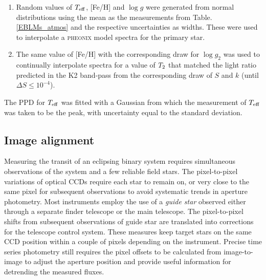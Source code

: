\begin{enumerate}
    \item Random values of $T_{\rm eff}$, [Fe/H] and $\log g$ were generated from normal distributions using the mean as the measurements from Table.\ref{EBLMs_atmos} and the respective uncertainties as widths. These were used to interpolate a \textsc{pheonix} model spectra for the primary star. 
    
    \item The same value of [Fe/H] with the corresponding draw for $\log g_2$ was used to continually interpolate spectra for a value of $T_{\rm 2}$ that matched the light ratio predicted in the K2 band-pass from the corresponding draw of $S$ and $k$ (until $\Delta S \leq 10^{-4}$).
\end{enumerate}
The PPD for $T_{\rm eff}$ was fitted with a Gaussian from which the measurement of $T_{\rm eff}$ was taken to be the peak, with uncertainty equal to the standard deviation.




















\iffalse
\subsection{Image alignment}\label{image_alignment}

Measuring the transit of an eclipsing binary system requires simultaneous observations of the system and a few reliable field stars. The pixel-to-pixel variations of optical CCDs require each star to remain on, or very close to the same pixel for subsequent observations to avoid systematic trends in aperture photometry. Most instruments employ the use of a \textit{guide star} observed either through a separate finder telescope or the main telescope. The pixel-to-pixel shifts from subsequent observations of guide star are translated into corrections for the telescope control system. These measures keep target stars on the same CCD position within a couple of pixels depending on the instrument. Precise time series photometry still requires the pixel offsets to be calculated from image-to-image to adjust the aperture position and provide useful information for detrending the measured fluxes.

